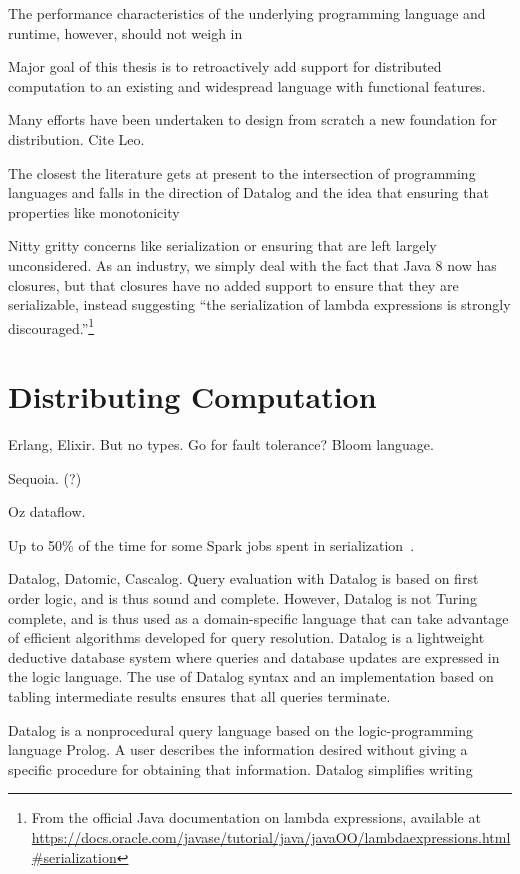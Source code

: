The performance characteristics of the underlying programming language and
runtime, however, should not weigh in

Major goal of this thesis is to retroactively add support for distributed
computation to an existing and widespread language with functional features.

Many efforts have been undertaken to design from scratch a new foundation for
distribution. Cite Leo.


The closest the literature gets at present to the intersection of programming
languages and falls in the direction of Datalog and the idea that ensuring that
properties like monotonicity

Nitty gritty concerns like serialization or ensuring that are left largely
unconsidered. As an industry, we simply deal with the fact that Java 8 now has
closures, but that closures have no added support to ensure that they are
serializable, instead suggesting ``the serialization of lambda expressions is
strongly discouraged.''\footnote{From the official Java documentation on lambda
expressions, available at
\url{https://docs.oracle.com/javase/tutorial/java/javaOO/lambdaexpressions.html\#serialization}}

\section{Distributing Computation}



Erlang, Elixir. But no types. Go for fault tolerance? Bloom language.

Sequoia. (?)

Oz dataflow.

Up to 50\% of the time for some Spark jobs spent in
serialization~\cite{OusterhoutSerialization}.

Datalog, Datomic, Cascalog. Query evaluation with Datalog is based on first
order logic, and is thus sound and complete. However, Datalog is not Turing
complete, and is thus used as a domain-specific language that can take advantage
of efficient algorithms developed for query resolution. Datalog is a lightweight
deductive database system where queries and database updates are expressed in
the logic language. The use of Datalog syntax and an implementation based on
tabling intermediate results ensures that all queries terminate.

Datalog is a nonprocedural query language based on the logic-programming
language Prolog.  A user describes the information desired without giving a
specific procedure for obtaining that information. Datalog simplifies writing

